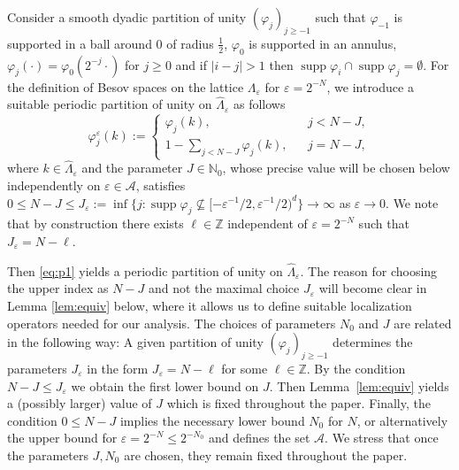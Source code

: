 \documentclass[a4paper,11pt]{article}
\newcommand{\assign}{:=}
\newcommand{\cdummy}{\cdot}
\newcommand{\tmop}[1]{\ensuremath{\operatorname{#1}}}
\numberwithin{equation}{section}
\begin{document}
Consider a smooth dyadic partition of unity $(\varphi_j)_{j \geqslant - 1}$
such that $\varphi_{- 1}$ is supported in a ball around $0$ of radius
$\frac{1}{2}$, $\varphi_0$ is supported in an annulus, $\varphi_j (\cdummy) =
\varphi_0 (2^{- j} \cdummy)$ for $j \geqslant 0$ and if $| i - j | > 1$ then
$\tmop{supp} \varphi_i \cap \tmop{supp} \varphi_j = \emptyset$. For the
definition of Besov spaces on the lattice $\Lambda_{\varepsilon}$ for
$\varepsilon = 2^{- N}$, we introduce a suitable periodic partition of unity
on $\hat{\Lambda}_{\varepsilon}$ as follows
\begin{equation}
  \varphi^{\varepsilon}_j (k) \assign \left\{ \begin{array}{lll}
    \varphi_j (k), &  & j < N - J,\\
    1 - \sum_{j < N - J} \varphi_j (k), &  & j = N - J,
  \end{array} \right. \label{eq:p1}
\end{equation}
where $k \in \hat{\Lambda}_{\varepsilon}$ and the parameter $J \in
\mathbb{N}_0$, whose precise value will be chosen below independently on
$\varepsilon \in \mathcal{A}$, satisfies $0 \leqslant N - J \leqslant
J_{\varepsilon} \assign \inf \{ j : \tmop{supp} \varphi_j \not\subseteq
[-\varepsilon^{- 1}/2,\varepsilon^{- 1}/2 )^d \} \rightarrow \infty$ as
$\varepsilon \rightarrow 0$. We note that by construction there exists $\ell
\in \mathbb{Z}$ independent of $\varepsilon = 2^{- N}$ such that
$J_{\varepsilon} = N - \ell$.

Then {\eqref{eq:p1}} yields a periodic partition of unity on
$\hat{\Lambda}_{\varepsilon}$. The reason for choosing the upper index as $N -
J$ and not the maximal choice $J_{\varepsilon}$ will become clear in Lemma
\ref{lem:equiv} below, where it allows us to define suitable localization
operators needed for our analysis. The choices of parameters $N_0$ and $J$ are
related in the following way: A given partition of unity $(\varphi_j)_{j
\geqslant - 1}$ determines the parameters $J_{\varepsilon}$ in the form
$J_{\varepsilon} = N - \ell$ for some $\ell \in \mathbb{Z}$. By the condition
$N - J \leqslant J_{\varepsilon}$ we obtain the first lower bound on $J$. Then
Lemma~\ref{lem:equiv} yields a (possibly larger) value of $J$ which is fixed
throughout the paper. Finally, the condition $0 \leqslant N - J$ implies
the necessary lower bound $N_0$ for $N$, or alternatively the upper bound for
$\varepsilon = 2^{- N} \leqslant 2^{- N_0}$ and defines the set $\mathcal{A}$.
We stress that once the parameters $J, N_0$ are chosen, they remain fixed
throughout the paper.
\end{document}
